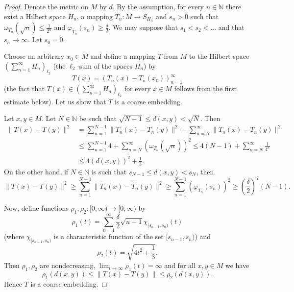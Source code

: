 \documentclass[a4paper,oneside]{amsart}
\theoremstyle{definition}
\begin{document}
\begin{proof}
Denote the metric on $M$ by $d$. By the assumption, for every $n\in{\mathbb{N}}$ there exist a Hilbert space $H_n$, a mapping $T_n:M\to S_{H_n}$ and $s_n>0$ such that $\omega_{T_n}(\sqrt{n})\leq\frac{1}{2^n}$ and $\varphi_{T_n}(s_n)\geq\frac{\delta}{2}$. We may suppose that $s_1<s_2<...$ and that $s_n\to\infty$. Let $s_0=0$.

Choose an arbitrary $x_0\in M$ and define a mapping $T$ from $M$ to the Hilbert space $\left(\sum_{n=1}^\infty H_n\right)_{\ell_2}$ (the $\ell_2$-sum of the spaces $H_n$) by $$T(x)=\left(T_n(x)-T_n(x_0)\right)_{n=1}^\infty$$ 
(the fact that $T(x)\in\left(\sum_{n=1}^\infty H_n\right)_{\ell_2}$ for every $x\in M$ follows from the first estimate below). Let us show that $T$ is a coarse embedding. 

Let $x,y\in M$. Let $N\in{\mathbb{N}}$ be such that $\sqrt{N-1}\leq d(x,y)<\sqrt{N}$. Then
\begin{align*}
\|T(x)-T(y)\|^2&=\sum_{n=1}^{N-1}\|T_n(x)-T_n(y)\|^2+\sum_{n=N}^\infty\|T_n(x)-T_n(y)\|^2\\
&\leq\sum_{n=1}^{N-1}4+\sum_{n=N}^\infty\left(\omega_{T_n}(\sqrt{n})\right)^2\leq4(N-1)+\sum_{n=N}^\infty\frac{1}{4^n}\\
&\leq4(d(x,y))^2+\frac{1}{3}.
\end{align*}
On the other hand, if $N\in{\mathbb{N}}$ is such that $s_{N-1}\leq d(x,y)<s_N$, then
$$\|T(x)-T(y)\|^2\geq\sum_{n=1}^{N-1}\|T_n(x)-T_n(y)\|^2\geq\sum_{n=1}^{N-1}\left(\varphi_{T_n}(s_n)\right)^2\geq\left(\frac{\delta}{2}\right)^2(N-1).$$

Now, define functions $\rho_1,\rho_2:[0,\infty)\to[0,\infty)$ by $$\rho_1(t)=\sum_{n=1}^\infty\frac{\delta}{2}\sqrt{n-1}\chi_{[s_{n-1},s_n)}(t)$$ 
(where $\chi_{[s_{n-1},s_n)}$ is a characteristic function of the set $[s_{n-1},s_n)$) and 
$$\rho_2(t)=\sqrt{4t^2+\frac{1}{3}}.$$ 
Then $\rho_1,\rho_2$ are nondecreasing, $\lim_{t\to\infty}\rho_1(t)=\infty$ and for all $x,y\in M$ we have $$\rho_1(d(x,y))\leq\|T(x)-T(y)\|\leq\rho_2(d(x,y)).$$ 
Hence $T$ is a coarse embedding.
\end{proof}
\end{document}
